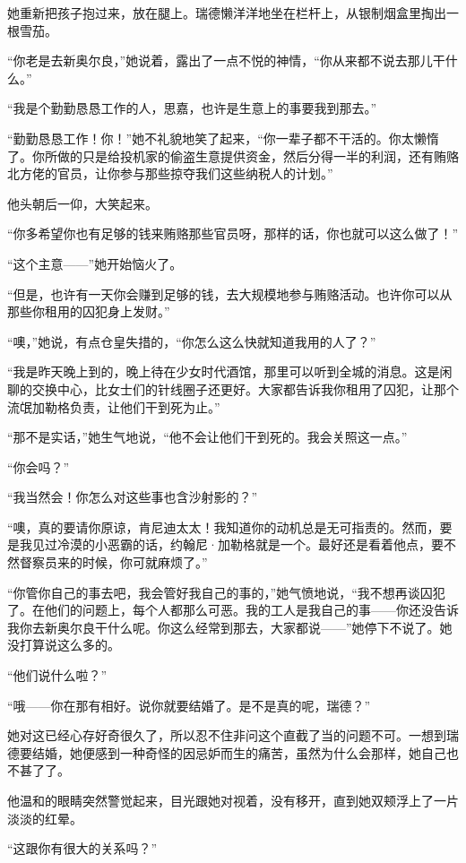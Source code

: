\par 她重新把孩子抱过来，放在腿上。瑞德懒洋洋地坐在栏杆上，从银制烟盒里掏出一根雪茄。
\par “你老是去新奥尔良，”她说着，露出了一点不悦的神情，“你从来都不说去那儿干什么。”
\par “我是个勤勤恳恳工作的人，思嘉，也许是生意上的事要我到那去。”
\par “勤勤恳恳工作！你！”她不礼貌地笑了起来，“你一辈子都不干活的。你太懒惰了。你所做的只是给投机家的偷盗生意提供资金，然后分得一半的利润，还有贿赂北方佬的官员，让你参与那些掠夺我们这些纳税人的计划。”
\par 他头朝后一仰，大笑起来。
\par “你多希望你也有足够的钱来贿赂那些官员呀，那样的话，你也就可以这么做了！”
\par “这个主意——”她开始恼火了。
\par “但是，也许有一天你会赚到足够的钱，去大规模地参与贿赂活动。也许你可以从那些你租用的囚犯身上发财。”
\par “噢，”她说，有点仓皇失措的，“你怎么这么快就知道我用的人了？”
\par “我是昨天晚上到的，晚上待在少女时代酒馆，那里可以听到全城的消息。这是闲聊的交换中心，比女士们的针线圈子还更好。大家都告诉我你租用了囚犯，让那个流氓加勒格负责，让他们干到死为止。”
\par “那不是实话，”她生气地说，“他不会让他们干到死的。我会关照这一点。”
\par “你会吗？”
\par “我当然会！你怎么对这些事也含沙射影的？”
\par “噢，真的要请你原谅，肯尼迪太太！我知道你的动机总是无可指责的。然而，要是我见过冷漠的小恶霸的话，约翰尼·加勒格就是一个。最好还是看着他点，要不然督察员来的时候，你可就麻烦了。”
\par “你管你自己的事去吧，我会管好我自己的事的，”她气愤地说，“我不想再谈囚犯了。在他们的问题上，每个人都那么可恶。我的工人是我自己的事——你还没告诉我你去新奥尔良干什么呢。你这么经常到那去，大家都说——”她停下不说了。她没打算说这么多的。
\par “他们说什么啦？”
\par “哦——你在那有相好。说你就要结婚了。是不是真的呢，瑞德？”
\par 她对这已经心存好奇很久了，所以忍不住非问这个直截了当的问题不可。一想到瑞德要结婚，她便感到一种奇怪的因忌妒而生的痛苦，虽然为什么会那样，她自己也不甚了了。
\par 他温和的眼睛突然警觉起来，目光跟她对视着，没有移开，直到她双颊浮上了一片淡淡的红晕。
\par “这跟你有很大的关系吗？”
